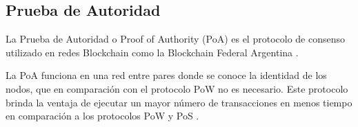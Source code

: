 \subsection{Prueba de Autoridad }\label{sec:poa}
La Prueba de Autoridad o Proof of Authority  (PoA) es el protocolo de consenso utilizado en redes  Blockchain  como la  Blockchain  Federal Argentina \cite[]{Blockchain_federal_argentina_protocolos_2020}.

La PoA funciona en una red entre pares donde se conoce la identidad de los nodos, que en comparación con el protocolo PoW no es necesario. 
Este protocolo brinda la ventaja de ejecutar un mayor número de transacciones en menos tiempo en comparación  a los protocolos PoW y PoS \cite[]{retamal_Blockchain_2017,Blockchain_federal_argentina_protocolos_2020}.
